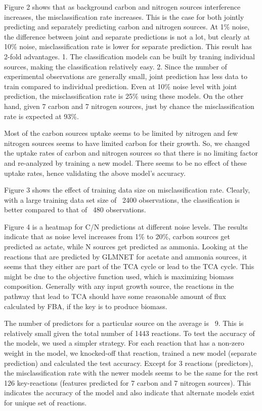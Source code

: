 \documentclass[12pt]{article}
\begin{document}
\bigskip
\noindent
Figure 2 shows that as background carbon and nitrogen sources interference increases, the misclassification rate increases. This is the case for both jointly predicting and separately predicting carbon and nitrogen sources. At 1\% noise, the difference between joint and separate predictions is not a lot, but clearly at 10\% noise, misclassification rate is lower for separate prediction. This result has 2-fold advantages. 1. The classification models can be built by traning individual sources, making the classification relatively easy. 2. Since the number of experimental observations are generally small, joint prediction has less data to train compared to individual prediction. Even at 10\% noise level with joint prediction, the misclassification rate is 25\% using these models. On the other hand, given 7 carbon and 7 nitrogen sources, just by chance the misclassification rate is expected at 93\%.

\bigskip
\noindent
Most of the carbon sources uptake seems to be limited by nitrogen and few nitrogen sources seems to have limited carbon for their growth. So, we changed the uptake rates of carbon and nitrogen sources so that there is no limiting factor and re-analyzed by training a new model. There seems to be no effect of these uptake rates, hence validating the above model's accuracy.

\bigskip
\noindent
Figure 3 shows the effect of training data size on misclassification rate.  Clearly, with a large training data set size of ~2400 observations, the classification is better compared to that of ~480 observations.

\bigskip
\noindent
Figure 4 is a heatmap for C/N predictions at different noise levels. The results indicate that as noise level increases from 1\% to 20\%, carbon sources get predicted as actate, while N sources get predicted as ammonia. Looking at the reactions that are predicted by GLMNET for acetate and ammonia sources, it seems that they either are part of the TCA cycle or lead to the TCA cycle. This might be due to the objective function used, which is maximizing biomass composition. Generally with any input growth source, the reactions in the pathway that lead to TCA should have some reasonable amount of flux calculated by FBA, if the key is to produce biomass.

\bigskip
\noindent
The number of predictors for a particular source on the average is ~9. This is relatively small given the total number of 1443 reactions. To test the accuracy of the models, we used a simpler strategy. For each reaction that has a non-zero weight in the model, we knocked-off that reaction, trained a new model (separate prediction) and calculated the test accuracy. Except for 3 reactions (predictors), the misclassification rate with the newer models seems to be the same for the rest 126 key-reactions (features predicted for 7 carbon and 7 nitrogen sources). This indicates the accuracy of the model and also indicate that alternate models exist for unique set of reactions.
\end{document}
